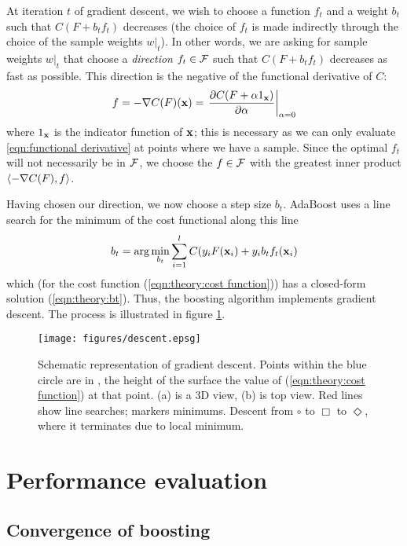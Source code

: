 At iteration $t$ of gradient descent, we wish to choose a function $f_t$ and
a weight $b_t$ such that $C(F + b_t f_t)$ decreases (the choice of
$f_t$ is made indirectly through the choice of the sample weights
$w|_t$).  In other words, we are asking for sample weights $w|_t$ that
choose a \emph{direction} $f_t \in \mathcal{F}$ such that $C(F + b_t f_t)$
decreases as fast as possible.  This direction is the negative of the
functional derivative of $C$:
%
\begin{equation}
f = -\nabla C(F)(\mathbf{x}) = \left. \frac{\partial C(F + \alpha
1_{\mathbf{x}})}{\partial \alpha} \right|_{\alpha = 0}
\label{eqn:functional derivative}
\end{equation}
%
where $1_{\mathbf{x}}$ is the indicator function of $\mathbf{x}$; this is
necessary as we can only evaluate \ref{eqn:functional derivative} at
points where we have a sample.  Since the
optimal $f_t$ will not necessarily be in $\mathcal{F}$, we choose the
$f \in \mathcal{F}$ with the greatest inner product $\langle {-\nabla
C(F)} , {f} \rangle$.

Having chosen our direction, we now choose a step size $b_t$.
AdaBoost uses a line search for the minimum of the cost functional
along this line
%
\begin{equation}
b_t = \arg \min_{b_t} \sum_{i=1}^{l} C(y_i F(\mathbf{x}_i) + y_i b_t f_t(\mathbf{x}_i)
\end{equation}
%
which (for the cost function (\ref{eqn:theory:cost
function})) has a closed-form solution  (\ref{eqn:theory:bt}).  Thus, the
boosting algorithm implements gradient descent.  The process is
illustrated in figure \ref{fig:gradient descent}.

\begin{figure}
\begin{center}
\texttt{[image: figures/descent.epsg]}
\caption{Schematic representation of gradient descent.  Points within the blue
circle are in \calF, the height of the surface the value of
(\ref{eqn:theory:cost function}) at that point.  (a) is a 3D view, (b)
is top view. Red lines show line searches; markers minimums.  Descent
from $\circ$ to $\Box$ to $\Diamond$, where it terminates due to
local minimum.}
\label{fig:gradient descent}
\end{center}
\end{figure}


\section{Performance evaluation}


\subsection{Convergence of boosting}

